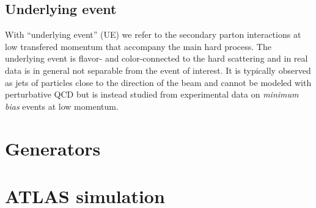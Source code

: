 \subsection{Underlying event}\label{sec:underlyingevent}

With ``underlying event'' (UE) we refer to the secondary parton interactions 
at low transfered momentum that accompany the main hard process. 
The underlying event is flavor- and color-connected to the hard scattering
and in real data is in general not separable from the event of interest.
It is typically observed as jets of particles close to the direction
of the beam and cannot be modeled with perturbative QCD but is instead
studied from experimental data on {\it minimum bias} events at low
momentum.

\section{Generators}\label{sec:generators}

\section{ATLAS simulation}\label{sec:MCdetector}
